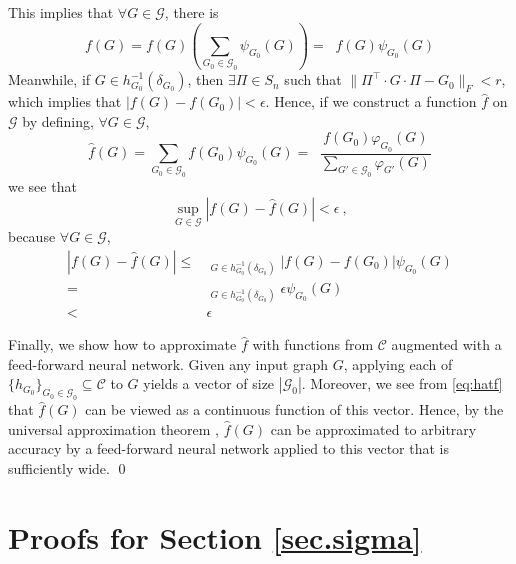 \documentclass{article}
\def\Gfun{\mathcal{G}}
\begin{document}
This implies that $\forall G \in \Gfun$, there is
\begin{equation*}
    f(G) = f(G) \left (\sum_{G_0 \in \Gfun_0}  \psi_{G_0}(G) \right ) = \mathop{\sum_{G_0 \in \Gfun_0}} f(G) \psi_{G_0}(G)
\end{equation*}
Meanwhile, if $G \in h_{G_0}^{-1}(\delta_{G_0})$, then $\exists \Pi \in S_n$ such that $\| \Pi^\intercal \cdot G \cdot \Pi - G_0 \|_F < r$, which implies that $|f(G) - f(G_0)| < \epsilon$. Hence, if we construct a function $\hat{f}$ on $\Gfun$ by defining, $\forall G \in \Gfun$,
\begin{equation}
\label{eq:hatf}
    \hat{f}(G) = \sum_{G_0 \in \Gfun_0} f(G_0) \psi_{G_0}(G) = \mathop{\sum_{G_0 \in \Gfun_0}} \frac{f(G_0) \varphi_{G_0}(G)}{\sum_{G' \in \Gfun_0} \varphi_{G'}(G)}
\end{equation}
we see that 
\begin{equation}
    \sup_{G \in \Gfun} |f(G) - \hat{f}(G)| < \epsilon~,
\end{equation}
because $\forall G \in \Gfun$,
\begin{equation}
    \begin{split}
        |f(G) - \hat{f}(G) | \leq & \mathop{\sum_{G_0 \in \Gfun_0}}_{G \in h_{G_0}^{-1}(\delta_{G_0})} \left | f(G) - f(G_0) \right | \psi_{G_0}(G) \\
        =& \mathop{\sum_{G_0 \in \Gfun_0}}_{G \in h_{G_0}^{-1}(\delta_{G_0})} \epsilon \psi_{G_0}(G) \\
        <& \epsilon
    \end{split}
\end{equation}

Finally, we show how to approximate $\hat{f}$ with functions from $\mathcal{C}$ augmented with a feed-forward neural network. Given any input graph $G$, applying each of $\{h_{G_0}\}_{G_0 \in \Gfun_0} \subseteq \mathcal{C}$ to $G$ yields a vector of size $|\Gfun_0|$. Moreover, we see from \eqref{eq:hatf} that $\hat{f}(G)$ can be viewed as a continuous function of this vector. Hence, by the universal approximation theorem \citep{cybenko1989approximation, hornik1991hornik}, $\hat{f}(G)$ can be approximated to arbitrary accuracy by a feed-forward neural network applied to this vector that is sufficiently wide. \qed

\section{Proofs for Section \ref{sec.sigma}} \label{sec.proofs.reformulating}
\end{document}
